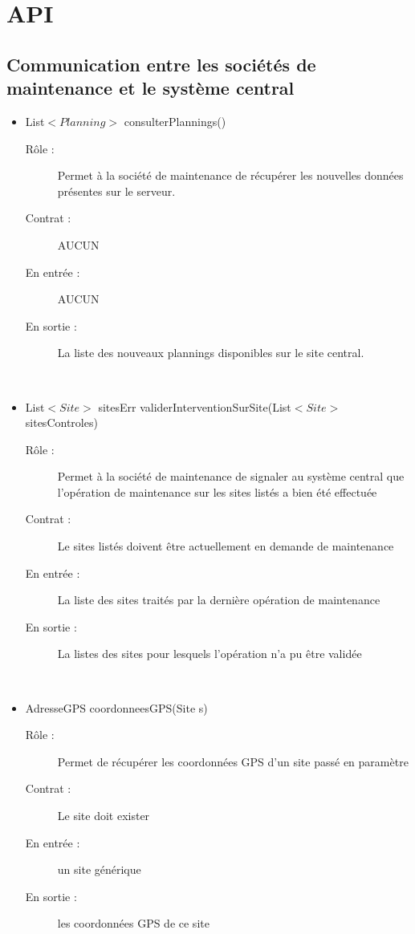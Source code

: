 \section{API}

\subsection{Communication entre les sociétés de maintenance et le système central}
\begin{itemize}
	\item List$<Planning>$ consulterPlannings()
	\begin{description} 
		\item[Rôle :] Permet à la société de maintenance de récupérer les nouvelles données présentes sur le serveur.
		\item[Contrat :] AUCUN
		\item[En entrée :] AUCUN
		\item[En sortie :] La liste des nouveaux plannings disponibles sur le site central.
	\end{description}
	~\\
	\item List$<Site>$ sitesErr validerInterventionSurSite(List$<Site>$ sitesControles)
	\begin{description} 
		\item[Rôle :] Permet à la société de maintenance de signaler au système central que l'opération de maintenance sur les sites listés a bien  été effectuée
		\item[Contrat :] Le sites listés doivent être actuellement en demande de maintenance
		\item[En entrée :] La liste des sites traités par la dernière opération de maintenance
		\item[En sortie :] La listes des sites pour lesquels l'opération n'a pu être validée
	\end{description}
	~\\
	\item AdresseGPS coordonneesGPS(Site s)
	\begin{description} 
		\item[Rôle :] Permet de récupérer les coordonnées GPS d'un site passé en paramètre
		\item[Contrat :] Le site doit exister
		\item[En entrée :] un site générique
		\item[En sortie :] les coordonnées GPS de ce site
	\end{description}
	~\\

\end{itemize}

